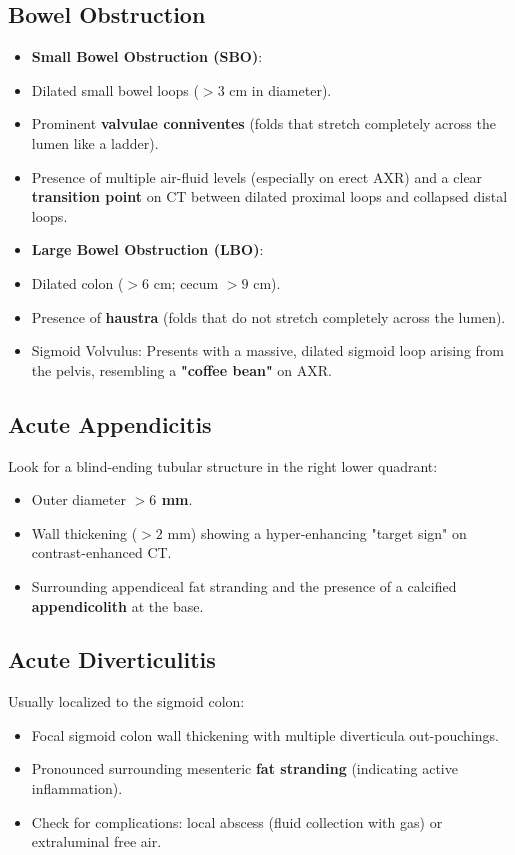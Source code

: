 \subsection*{Bowel Obstruction}
\begin{itemize}
    \item \textbf{Small Bowel Obstruction (SBO)}:
    \item Dilated small bowel loops ($> 3$ cm in diameter).
    \item Prominent \textbf{valvulae conniventes} (folds that stretch completely across the lumen like a ladder).
    \item Presence of multiple air-fluid levels (especially on erect AXR) and a clear \textbf{transition point} on CT between dilated proximal loops and collapsed distal loops.
    \item \textbf{Large Bowel Obstruction (LBO)}:
    \item Dilated colon ($> 6$ cm; cecum $> 9$ cm).
    \item Presence of \textbf{haustra} (folds that do not stretch completely across the lumen).
    \item Sigmoid Volvulus: Presents with a massive, dilated sigmoid loop arising from the pelvis, resembling a \textbf{"coffee bean"} on AXR.
\end{itemize}

\subsection*{Acute Appendicitis}
Look for a blind-ending tubular structure in the right lower quadrant:
\begin{itemize}
    \item Outer diameter \textbf{$> 6$ mm}.
    \item Wall thickening ($> 2$ mm) showing a hyper-enhancing "target sign" on contrast-enhanced CT.
    \item Surrounding appendiceal fat stranding and the presence of a calcified \textbf{appendicolith} at the base.
\end{itemize}

\subsection*{Acute Diverticulitis}
Usually localized to the sigmoid colon:
\begin{itemize}
    \item Focal sigmoid colon wall thickening with multiple diverticula out-pouchings.
    \item Pronounced surrounding mesenteric \textbf{fat stranding} (indicating active inflammation).
    \item Check for complications: local abscess (fluid collection with gas) or extraluminal free air.
\end{itemize}

